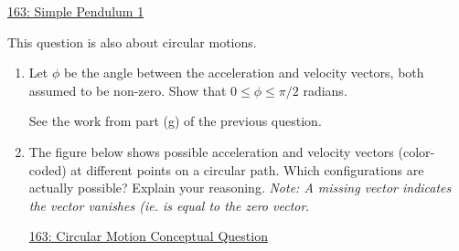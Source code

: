 \documentclass{ximera}
\begin{document}
\begin{question} \label{Qdsf3r34r5rt}


\begin{onlineOnly}
    \begin{center}
\end{center}
\end{onlineOnly}

\href{https://www.geogebra.org/classic/gkbsdkrd}{163: Simple Pendulum 1}
\end{question}

\begin{question}  \label{Q32frr3r4r4}
This question is also about circular motions.
\begin{enumerate}

\item Let $\phi$ be the angle between the acceleration and velocity vectors, both assumed to be non-zero. Show that $0\leq \phi \leq \pi/2$ radians.

\begin{hint}
See the work from part (g) of the previous question.
\end{hint}

\item The figure below shows possible acceleration and velocity vectors (color-coded) at different points on a circular path. Which configurations are actually possible? Explain your reasoning. \emph{Note: A missing vector indicates the vector vanishes (ie. is equal to the zero vector}.

\begin{freeResponse}
\end{freeResponse}

\begin{onlineOnly}
    \begin{center}
\end{center}
\end{onlineOnly}

\href{https://www.geogebra.org/classic/yzcwddhb}{163: Circular Motion Conceptual Question}

\end{enumerate}

\end{question}
\end{document}
